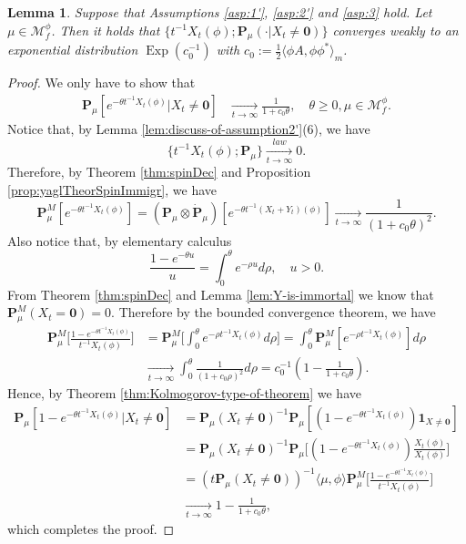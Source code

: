 \documentclass[UTF8]{pkuthss}
\theoremstyle{plain}
\newtheorem{lem}[thm]{Lemma}
\theoremstyle{definition}
\numberwithin{equation}{section}
\begin{document}
\begin{lem}\label{lem:Yaglom-for-phi}
	Suppose that Assumptions \ref{asp:1'}, \ref{asp:2'} and \ref{asp:3} hold. Let $\mu \in \mathcal M_f^\phi$.
	Then it holds that $\{t^{-1}X_t(\phi);\mathbf P_\mu(\cdot | X_t\neq\mathbf 0)\}$
   converges weakly to 
   an exponential distribution
	$\operatorname{Exp}(c_0^{-1})$ with $c_0 := \frac{1}{2}\langle\phi A,\phi\phi^*\rangle_m$.
\end{lem}

\begin{proof}
 We only have to show that
\begin{align}
	\mathbf P_\mu[e^{-\theta t^{-1}X_t(\phi)} |X_t\neq\mathbf 0]
	&\xrightarrow[t\to\infty]{}\frac{1}{1+c_0\theta},
	\quad \theta\geq 0, \mu\in \mathcal M_f^\phi.
\end{align}
	Notice that, by Lemma \ref{lem:discuss-of-assumption2'}(6), we have
\[
	\{t^{-1}X_t(\phi);\mathbf P_\mu\}
	\xrightarrow[t\to\infty]{law} 0.
\]
	Therefore, by Theorem \ref{thm:spinDec} and Proposition \ref{prop:yaglTheorSpinImmigr}, we have
\[
	\mathbf P^M_\mu[e^{-\theta t^{-1}X_t(\phi)}]
	= (\mathbf P_\mu \otimes \dot {\mathbf P}_\mu)[e^{-\theta t^{-1}(X_t+Y_t)(\phi)}]
	\xrightarrow[t\to\infty]{}\frac{1}{(1+c_0\theta)^2}.
\]
	Also notice that, by elementary calculus
\[
	\frac{1-e^{-\theta u}}{u}
	=\int_0^\theta e^{-\rho u} d\rho,
	\quad u> 0.
\]
	From Theorem \ref{thm:spinDec} and Lemma \ref{lem:Y-is-immortal} we know that $\mathbf P^M_\mu(X_t=\mathbf 0)=0$.
	Therefore by the bounded convergence theorem, we have
\begin{align}
	\mathbf P^M_\mu \Big[\frac{1-e^{-\theta t^{-1}X_t(\phi)}}{t^{-1}X_t(\phi)}\Big]
	&= \mathbf P^M_\mu\Big[\int_0^\theta e^{-\rho t^{-1}X_t(\phi) }d\rho\Big]
	= \int_0^\theta \mathbf P^M_\mu [ e^{-\rho t^{-1}X_t(\phi) }] d\rho\\
	&\xrightarrow[t\to\infty]{} \int_0^\theta \frac{1}{(1+c_0\rho)^2}d\rho
	= c_0^{-1} (1-\frac{1}{1+c_0\theta}).
\end{align}
	Hence, by Theorem \ref{thm:Kolmogorov-type-of-theorem} we have
\begin{align}
	\mathbf P_\mu[1-e^{-\theta t^{-1}X_t(\phi)} |X_t\neq \mathbf 0]
	&= \mathbf P_\mu(X_t\neq \mathbf 0)^{-1}\mathbf P_\mu[(1-e^{-\theta t^{-1}X_t(\phi)})\mathbf 1_{X\neq \mathbf 0}]\\
	&= \mathbf P_\mu(X_t\neq \mathbf 0)^{-1}\mathbf P_\mu\Big[(1-e^{-\theta t^{-1}X_t(\phi)})\frac{X_t(\phi)}{X_t(\phi)}\Big]\\
	&= (t\mathbf P_\mu(X_t\neq \mathbf 0))^{-1} \langle\mu,\phi\rangle \mathbf P^M_\mu \Big[\frac{1-e^{-\theta t^{-1}X_t(\phi)}}{t^{-1}X_t(\phi)}\Big]\\
	&\xrightarrow[t\to\infty]{}1-\frac{1}{1+c_0\theta},
\end{align}
	which completes the proof.
\end{proof}
\end{document}
